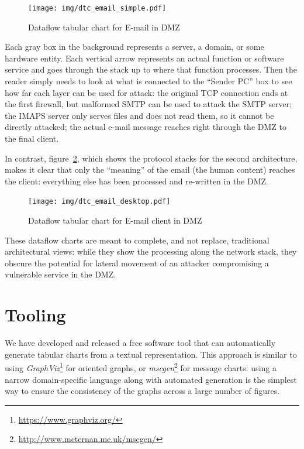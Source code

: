 \documentclass{article}
\begin{document}
\begin{figure}[ht]
	\centering
	\texttt{[image: img/dtc\_email\_simple.pdf]}
	\caption{Dataflow tabular chart for E-mail in DMZ}
	\label{fig:rutschle:dtc1}
\end{figure}



Each gray box in the background represents a server, a domain, or some hardware
entity. Each vertical arrow represents an actual function or software service
and goes through the stack up to where that function processes. Then the reader
simply needs to look at what is connected to the ``Sender PC'' box to see how far
each layer can be used for attack: the original TCP connection ends at the
first firewall, but malformed SMTP can be used to attack the SMTP server; the
IMAPS server only serves files and does not read them, so it cannot be directly
attacked; the actual e-mail message reaches right through the DMZ to the final
client.

In contrast, figure~\ref{fig:rutschle:dtc2}, which shows the protocol stacks
for the second architecture, makes it clear that only the ``meaning'' of the
email (the human content) reaches the client: everything else has been
processed and re-written in the DMZ.

\begin{figure}[ht]
	\centering
	\texttt{[image: img/dtc\_email\_desktop.pdf]}
	\caption{Dataflow tabular chart for E-mail client in DMZ}
	\label{fig:rutschle:dtc2}
\end{figure}


These dataflow charts are meant to complete, and not replace, traditional
architectural views: while they show the processing along the network stack,
they obscure the potential for lateral movement of an attacker compromising a
vulnerable service in the DMZ. 

\section{Tooling}

We have developed and released a free software tool that can automatically
generate tabular charts from a textual representation. This approach is similar
to using \emph{GraphViz}\footnote{\url{https://www.graphviz.org/}} for oriented
graphs, or \emph{mscgen}\footnote{\url{http://www.mcternan.me.uk/mscgen/}} for
message charts: using a narrow domain-specific language along with automated
generation is the simplest way to ensure the consistency of the graphs
across a large number of figures.
\end{document}
